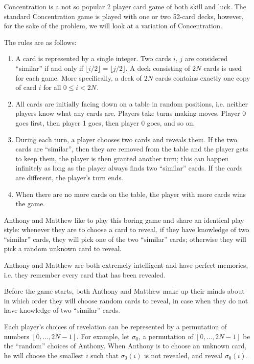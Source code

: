 


Concentration is a not so popular 2 player card game of both skill and luck. The standard Concentration game is played with one or two 52-card decks, however, for the sake of the problem, we will look at a variation of Concentration.

The rules are as follows:
\begin{enumerate}
\item A card is represented by a single integer. Two cards $i$, $j$ are considered ``similar'' if and only if $\lfloor i/2\rfloor=\lfloor j/2\rfloor$. A deck consisting of $2N$ cards is used for each game. More specifically, a deck of $2N$ cards contains exactly one copy of card $i$ for all $0\leq i <2N$.
\item All cards are initially facing down on a table in random positions, i.e. neither players know what any cards are. Players take turns making moves. Player 0 goes first, then player 1 goes, then player 0 goes, and so on.
\item During each turn, a player chooses two cards and reveals them. If the two cards are ``similar'', then they are removed from the table and the player gets to keep them, the player is then granted another turn; this can happen infinitely as long as the player always finds two ``similar'' cards. If the cards are different, the player's turn ends.
\item When there are no more cards on the table, the player with more cards wins the game.
\end{enumerate}

Anthony and Matthew like to play this boring game and share an identical play style: whenever they are to choose a card to reveal, if they have knowledge of two ``similar'' cards, they will pick one of the two ``similar'' cards; otherwise they will pick a random unknown card to reveal.

Anthony and Matthew are both extremely intelligent and have perfect memories, i.e. they remember every card that has been revealed.

Before the game starts, both Anthony and Matthew make up their minds about in which order they will choose random cards to reveal, in case when they do not have knowledge of two ``similar'' cards.

Each player's choices of revelation can be represented by a permutation of numbers $[0,\ldots, 2N-1]$.
For example, let $\sigma_0$, a permutation of $[0,\ldots, 2N-1]$ be the ``random'' choices of Anthony. When Anthony is to choose an unknown card, he will choose the smallest $i$ such that $\sigma_0(i)$ is not revealed, and reveal $\sigma_0(i)$.

